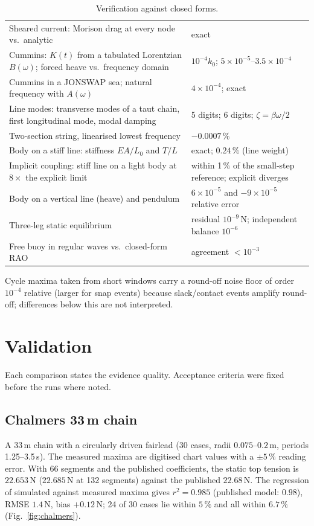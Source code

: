 \documentclass[11pt,a4paper]{article}
\begin{document}
\begin{table}[h]
\begin{tabular}{p{7.2cm}p{7cm}}
Sheared current: Morison drag at every node vs.\ analytic & exact \\
Cummins: $K(t)$ from a tabulated Lorentzian $B(\omega)$; forced heave vs.\ frequency domain & $10^{-4}k_0$; $5\times10^{-5}$--$3.5\times10^{-4}$ \\
Cummins in a JONSWAP sea; natural frequency with $A(\omega)$ & $4\times10^{-4}$; exact \\
Line modes: transverse modes of a taut chain, first longitudinal mode, modal damping & 5 digits; 6 digits; $\zeta=\beta\omega/2$ \\
Two-section string, linearised lowest frequency & $-0.0007\,\%$ \\
Body on a stiff line: stiffness $EA/L_0$ and $T/L$ & exact; $0.24\,\%$ (line weight) \\
Implicit coupling: stiff line on a light body at $8\times$ the explicit limit & within 1\,\% of the small-step reference; explicit diverges \\
Body on a vertical line (heave) and pendulum & $6\times10^{-5}$ and $-9\times10^{-5}$ relative error \\
Three-leg static equilibrium & residual $10^{-9}$\,N; independent balance $10^{-6}$ \\
Free buoy in regular waves vs.\ closed-form RAO & agreement $<10^{-3}$ \\
\bottomrule
\end{tabular}
\caption{Verification against closed forms.}\label{tab:verif}
\end{table}
Cycle maxima taken from short windows carry a round-off noise floor of order $10^{-4}$ relative (larger for snap events) because slack/contact events amplify round-off; differences below this are not interpreted.

\section{Validation}
Each comparison states the evidence quality. Acceptance criteria were fixed before the runs where noted.

\subsection{Chalmers 33\,m chain \cite{bergdahl2016}}
A 33\,m chain with a circularly driven fairlead (30 cases, radii $0.075$--$0.2$\,m, periods 1.25--3.5\,s). The measured maxima are digitised chart values with a $\pm5\,\%$ reading error. With 66 segments and the published coefficients, the static top tension is $22.653$\,N ($22.685$\,N at 132 segments) against the published $22.68$\,N. The regression of simulated against measured maxima gives $r^2=0.985$ (published model: $0.98$), RMSE $1.4$\,N, bias $+0.12$\,N; 24 of 30 cases lie within $5\,\%$ and all within $6.7\,\%$ (Fig.~\ref{fig:chalmers}).
\end{document}
